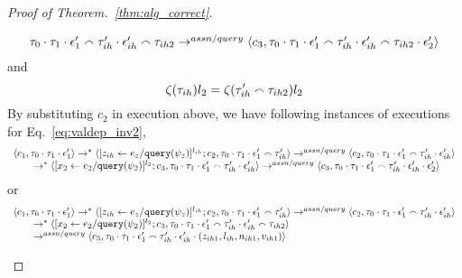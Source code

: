 \begin{proof}[Proof of Theorem.~\ref{thm:alg_correct}]
\begin{case}
\begin{subcase}
\begin{equation}
\begin{array}{l}
{  \ensuremath{\mathtt{\tau}}_0 \cdot \ensuremath{\mathtt{\tau}}_1 \cdot \ensuremath{\mathtt{\epsilon}}_1'  \smallfrown\ensuremath{\mathtt{\tau}}_{ih}' \cdot \ensuremath{\mathtt{\epsilon}}_{ih}' \smallfrown\ensuremath{\mathtt{\tau}}_{ih2}} 
  \rightarrow^{assn/query} 
  \langle {c}_3,  \mathtt{\tau}_0 \cdot \mathtt{\tau}_1 \cdot \mathtt{\epsilon}_1'  \smallfrown \mathtt{\tau}_{ih}' \cdot \mathtt{\epsilon}_{ih}' \smallfrown \mathtt{\tau}_{ih2} \cdot \mathtt{\epsilon}_2' \rangle 
\end{array}
 \end{equation}
and
 \[
 \mathtt{\zeta}(\mathtt{\tau}_{ih}) l_2 = \mathtt{\zeta}(\mathtt{\tau}_{ih}'\smallfrown \mathtt{\tau}_{ih2}) l_2
 \]
By substituting $c_2$  in execution above, 
we have following instances of executions for Eq.~\ref{eq:valdep_inv2}, 
%
\begin{equation}
\label{eq:m1asn_inv2}
  \begin{array}{l}   
  \langle c_1, \mathtt{\tau}_0 \cdot \mathtt{\tau}_1 \cdot \mathtt{\epsilon}_1' \rangle 
  \rightarrow^{*} 
  \langle [\mathrel{ z_{ih} \leftarrow e_z / {\tt query}(\psi_z) }]^{l_{ih}};{c}_2, 
  \mathtt{\tau}_0 \cdot \mathtt{\tau}_1 \cdot \mathtt{\epsilon}_1' \smallfrown \mathtt{\tau}_{ih}' \rangle 
  \rightarrow^{assn/query} 
  \langle {c}_2,  \mathtt{\tau}_0 \cdot \mathtt{\tau}_1 \cdot \mathtt{\epsilon}_1'  \smallfrown \mathtt{\tau}_{ih}' \cdot \mathtt{\epsilon}_{ih}' \rangle  \\
  \qquad \rightarrow^{*} 
  \langle [\mathrel{ {x}_2 \leftarrow e_2 / {\tt query}(\psi_2) }]^{l_2};{c}_3, 
  \mathtt{\tau}_0 \cdot \mathtt{\tau}_1 \cdot \mathtt{\epsilon}_1'  \smallfrown \mathtt{\tau}_{ih}' \cdot \mathtt{\epsilon}_{ih}' \rangle 
  \rightarrow^{assn/query} 
  \langle {c}_3,  \mathtt{\tau}_0 \cdot \mathtt{\tau}_1 \cdot \mathtt{\epsilon}_1'  \smallfrown \mathtt{\tau}_{ih}' \cdot \mathtt{\epsilon}_{ih}' \cdot \mathtt{\epsilon}_2' \rangle 
\end{array}
 \end{equation}
 or 
\[
  \begin{array}{l}   
  \langle c_1, \mathtt{\tau}_0 \cdot \mathtt{\tau}_1 \cdot \mathtt{\epsilon}_1' \rangle 
  \rightarrow^{*} 
  \langle [\mathrel{ z_{ih} \leftarrow e_z / {\tt query}(\psi_z) }]^{l_{ih}};{c}_2, 
  \mathtt{\tau}_0 \cdot \mathtt{\tau}_1 \cdot \mathtt{\epsilon}_1' \smallfrown \mathtt{\tau}_{ih}' \rangle 
  \rightarrow^{assn/query} 
  \langle {c}_2,  \mathtt{\tau}_0 \cdot \mathtt{\tau}_1 \cdot \mathtt{\epsilon}_1'  \smallfrown \mathtt{\tau}_{ih}' \cdot \mathtt{\epsilon}_{ih}' \rangle  \\
  \qquad \rightarrow^{*} 
  \langle [\mathrel{ {x}_2 \leftarrow e_2 / {\tt query}(\psi_2) }]^{l_2};{c}_3, 
  \mathtt{\tau}_0 \cdot \mathtt{\tau}_1 \cdot \mathtt{\epsilon}_1'  \smallfrown \mathtt{\tau}_{ih}' \cdot \mathtt{\epsilon}_{ih}' \smallfrown \mathtt{\tau}_{ih2} \rangle 
  \\ \qquad
  \rightarrow^{assn/query} 
  \langle {c}_3,  \mathtt{\tau}_0 \cdot \mathtt{\tau}_1 \cdot \mathtt{\epsilon}_1'  \smallfrown \mathtt{\tau}_{ih}' \cdot \mathtt{\epsilon}_{ih}' \cdot (z_{ih1}, l_{ih}, n_{ih1}, v_{ih1}) \rangle 

\end{array}\]
\end{subcase}
\end{case}
\end{proof}
